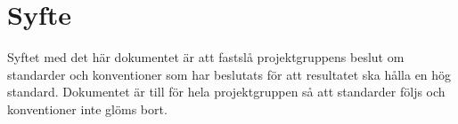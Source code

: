 \section{Syfte}
Syftet med det här dokumentet är att fastslå projektgruppens beslut om standarder och konventioner som har beslutats för att resultatet ska hålla en hög standard. Dokumentet är till för hela projektgruppen så att standarder följs och konventioner inte glöms bort.